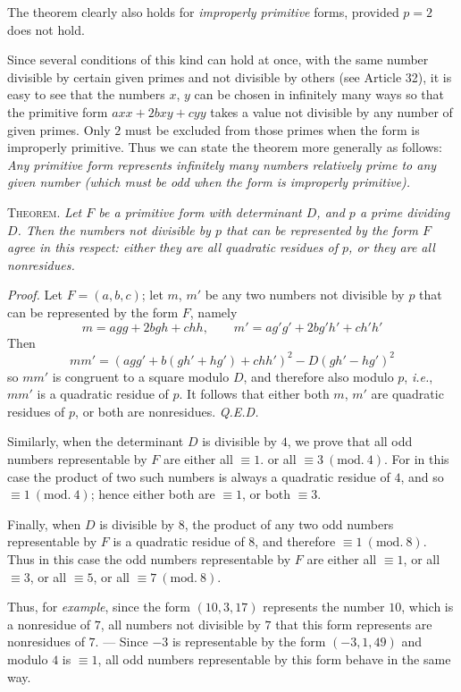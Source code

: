 The theorem clearly also holds for \textit{improperly primitive} forms, provided $p=2$ does not hold.

Since several conditions of this kind can hold at once, with the same number divisible by certain given primes and not divisible by others (see Article 32), it is easy to see that the numbers $x$, $y$ can be chosen in infinitely many ways so that the primitive form $axx+2bxy+cyy$ takes a value not divisible by any number of given primes. Only $2$ must be excluded from those primes when the form is improperly primitive. Thus we can state the theorem more generally as follows: \textit{Any primitive form represents infinitely many numbers relatively prime to any given number (which must be odd when the form is improperly primitive).}

\textsc{Theorem.} \textit{Let $F$ be a primitive form with determinant $D$, and $p$ a prime dividing $D$. Then the numbers not divisible by $p$ that can be represented by the form $F$ agree in this respect: either they are all quadratic residues of $p$, or they are all nonresidues.}

\textit{Proof.} Let $F=(a,b,c)$; let $m$, $m'$ be any two numbers not divisible by $p$ that can be represented by the form $F$, namely
\[
m=agg+2bgh+chh,\qquad m'=ag'g'+2bg'h'+ch'h'
\]
Then
\[
mm'=(agg'+b(gh'+hg')+chh')^2-D(gh'-hg')^2
\]
so $mm'$ is congruent to a square modulo $D$, and therefore also modulo $p$, \textit{i.e.}, $mm'$ is a quadratic residue of $p$. It follows that either both $m$, $m'$ are quadratic residues of $p$, or both are nonresidues. \textit{Q.E.D.}

Similarly, when the determinant $D$ is divisible by $4$, we prove that all odd numbers representable by $F$ are either all $\equiv1$. or all $\equiv3\ (\mathrm{mod.}\ 4)$. For in this case the product of two such numbers is always a quadratic residue of $4$, and so $\equiv1\ (\mathrm{mod.}\ 4)$; hence either both are $\equiv1$, or both $\equiv3$.

Finally, when $D$ is divisible by $8$, the product of any two odd numbers representable by $F$ is a quadratic residue of $8$, and therefore $\equiv1\ (\mathrm{mod.}\ 8)$. Thus in this case the odd numbers representable by $F$ are either all $\equiv1$, or all $\equiv3$, or all $\equiv5$, or all $\equiv7\ (\mathrm{mod.}\ 8)$.

Thus, for \textit{example}, since the form $(10,3,17)$ represents the number $10$, which is a nonresidue of $7$, all numbers not divisible by $7$ that this form represents are nonresidues of $7$. --- Since $-3$ is representable by the form $(-3,1,49)$ and modulo $4$ is $\equiv1$, all odd numbers representable by this form behave in the same way.

